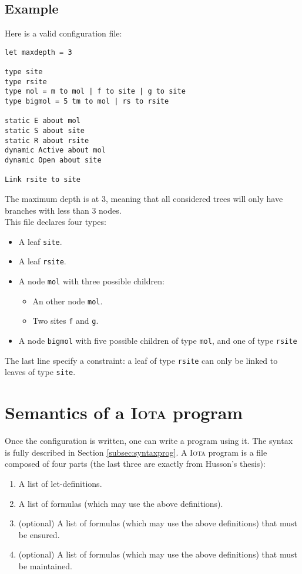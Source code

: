 \documentclass[10pt,a4paper]{article}
\newcommand\Iota{\textsc{Iota}}
\newcommand{\ocaml}{\texttt}
\begin{document}
\subsection{Example}
Here is a valid configuration file:
\begin{verbatim}
let maxdepth = 3

type site
type rsite
type mol = m to mol | f to site | g to site
type bigmol = 5 tm to mol | rs to rsite

static E about mol
static S about site
static R about rsite
dynamic Active about mol
dynamic Open about site

Link rsite to site
\end{verbatim}
The maximum depth is at 3, meaning that all considered trees will only have branches with less than 3 nodes.\\

This file declares four types:

\begin{itemize}
\item A leaf \ocaml{site}.
\item A leaf \ocaml{rsite}.
\item A node \ocaml{mol} with three possible children:
  \begin{itemize}
  \item An other node \ocaml{mol}.
  \item Two sites \ocaml{f} and \ocaml{g}.
  \end{itemize}
\item A node \ocaml{bigmol} with five possible children of type \ocaml{mol}, and one of type \ocaml{rsite}
\end{itemize}

The last line specify a constraint: a leaf of type \ocaml{rsite} can only be linked to leaves of type \ocaml{site}.

\section{Semantics of a \Iota{} program}
Once the configuration is written, one can write a program using it. The syntax is fully described in Section \ref{subsec:syntaxprog}. A \Iota{} program is a file composed of four parts (the last three are exactly from Husson's thesis):

\begin{enumerate}
\item A list of let-definitions.
\item A list of formulas (which may use the above definitions).
\item (optional) A list of formulas (which may use the above definitions) that must be ensured.
\item (optional) A list of formulas (which may use the above definitions) that must be maintained.
\end{enumerate}
\end{document}
